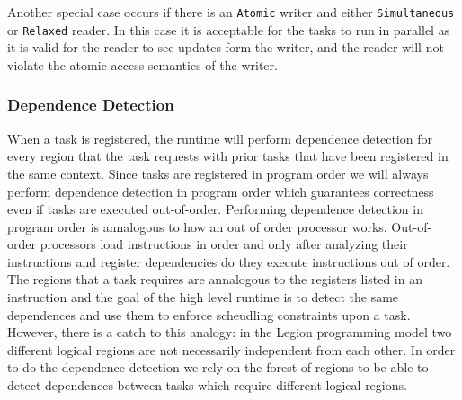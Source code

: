 Another special case occurs if there is an {\tt Atomic} writer and either {\tt Simultaneous}
or {\tt Relaxed} reader.  In this case it is acceptable for the tasks to run in
parallel as it is valid for the reader to see updates form the writer, and the
reader will not violate the atomic access semantics of the writer.



\subsubsection{Dependence Detection}
\label{subsec:depdetect}
When a task is registered, the runtime
will perform dependence detection for every region that the task requests with
prior tasks that have been registered in the same context.  Since
tasks are registered in program order we will always perform dependence detection
in program order which guarantees correctness even if tasks are executed out-of-order.  
Performing dependence detection in program order is annalogous to how an out of order
processor works.  Out-of-order processors load instructions in order and only after
analyzing their instructions and register dependencies do they execute instructions
out of order.  The regions that a task requires are annalogous
to the registers listed in an instruction and the goal of the high level
runtime is to detect the same dependences and use them to enforce scheudling constraints
upon a task.  However, there is a catch to this analogy: in the Legion programming
model two different logical regions are not necessarily independent from each other.  In
order to do the dependence detection we rely on the forest of regions to be
able to detect dependences between tasks which require different logical regions.


